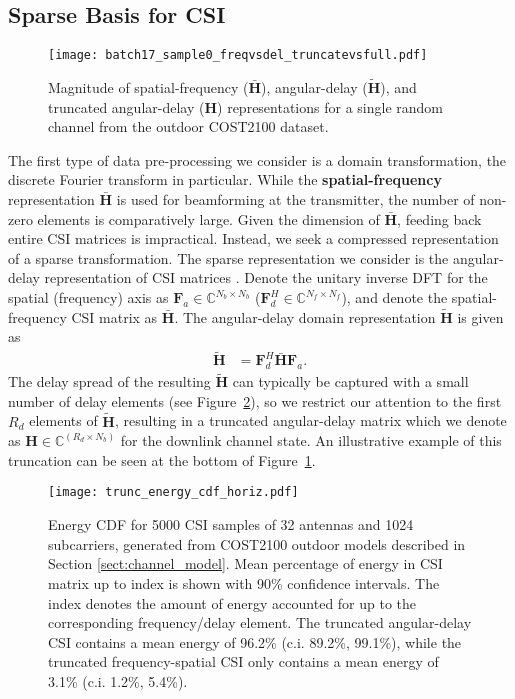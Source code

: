 \subsection{Sparse Basis for CSI} \label{sect:sparse-csi}

\begin{figure}[htb]
	\centering
	\texttt{[image: batch17\_sample0\_freqvsdel\_truncatevsfull.pdf]}
	\medskip
	\caption{Magnitude of spatial-frequency ($\bar{\mathbf H}$), angular-delay ($\tilde{\mathbf H}$), and truncated angular-delay ($\mathbf H$) representations for a single random channel from the outdoor COST2100 dataset.}
	\label{fig:freq-vs-delay}
\end{figure}

The first type of data pre-processing we consider is a domain transformation, the discrete Fourier transform in particular. While the \textbf{spatial-frequency} representation $\bar{\mathbf H}$ is used for beamforming at the transmitter, the number of non-zero elements is comparatively large. Given the dimension of $\bar{\mathbf H}$, feeding back entire CSI matrices is impractical. Instead, we seek a compressed representation of a sparse transformation. The sparse representation we consider is the angular-delay representation of CSI matrices \cite{ref:sayeed2002deconstructing}. Denote the unitary inverse DFT for the spatial (frequency) axis as $\mathbf F_a \in \mathbb C^{N_b \times N_b}$ ($\mathbf F_d^H \in \mathbb C^{N_f \times N_f}$), and denote the spatial-frequency CSI matrix as $\bar{\mathbf H}$. The angular-delay domain representation $\tilde{\mathbf H}$ is given as %
\begin{align*}
	\tilde{\mathbf H} &= \mathbf F_d^H \bar{\mathbf H} \mathbf F_a.
\end{align*}
The delay spread of the resulting $\tilde{\mathbf H}$ can typically be captured with a small number of delay elements (see Figure~\ref{fig:outdoor_energy_cdf}), so we restrict our attention to the first $R_d$ elements of $\tilde{\mathbf H}$, resulting in a truncated angular-delay matrix which we denote as $\mathbf H \in \mathbb C^{(R_d\times N_b)}$ for the downlink channel state. An illustrative example of this truncation can be seen at the bottom of Figure~\ref{fig:freq-vs-delay}. %

\begin{figure}[!hbtp]
    \centering
    \texttt{[image: trunc\_energy\_cdf\_horiz.pdf]}
    \caption{Energy CDF for 5000 
    CSI samples
of 32 antennas and 1024 subcarriers, generated
  from 
COST2100 outdoor models described in Section \ref{sect:channel_model}.
Mean percentage of energy in CSI matrix up to index is shown with 90\% confidence intervals. The index denotes the amount of energy accounted for up to the corresponding frequency/delay element. The truncated angular-delay CSI contains a mean energy of 96.2\% (c.i. 89.2\%, 99.1\%), while the truncated frequency-spatial CSI only contains a mean energy of 3.1\% (c.i. 1.2\%, 5.4\%).} 
    \label{fig:outdoor_energy_cdf}
\end{figure}

